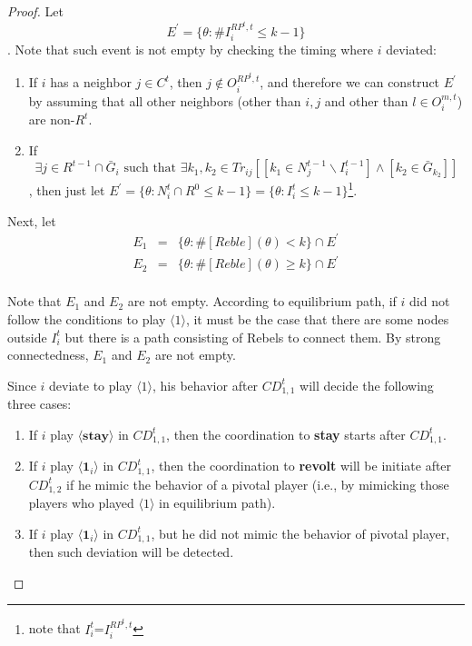 \documentclass[12pt,letter]{article}
\theoremstyle{definition}
\theoremstyle{remark}
\theoremstyle{claim}
\begin{document}
\begin{proof}


Let
\[E^{'}=\{\theta:\#I^{RP^t,t}_i\leq k-1\}\]
. Note that such event is not empty by checking the timing where $i$ deviated:
\begin{enumerate}
\item If $i$ has a neighbor $j\in C^t$, then $j\not\in O^{RP^t,t}_i$, and therefore we can construct $E^{'}$ by assuming that all other neighbors (other than $i,j$ and other than $l\in O^{m,t}_i$) are non-$R^t$.
\item If \[\exists j\in R^{t-1}\cap \bar{G}_i \text{ such that } \exists k_1,k_2\in Tr_{ij}[[k_1\in N^{t-1}_j\backslash I^{t-1}_i] \wedge [k_2\in \bar{G}_{k_2}]]\], then just let $E^{'}=\{\theta: N^t_i\cap R^0\leq k-1\}=\{\theta: I^t_i\leq k-1\}$\footnote{note that $I^t_i$=$I^{RP^t,t}_i$}.
\end{enumerate}

Next, let 
\begin{eqnarray*}
E_1&=&\{\theta: \#[Reble](\theta)<k\}\cap E^{'}\\
E_2&=&\{\theta: \#[Reble](\theta)\geq k\}\cap E^{'}\\
\end{eqnarray*}

Note that $E_1$ and $E_2$ are not empty. According to equilibrium path, if $i$ did not follow the conditions to play $\langle 1 \rangle$, it must be the case that there are some nodes outside $I^t_i$ but there is a path consisting of Rebels to connect them. By strong connectedness, $E_1$ and $E_2$ are not empty.

Since $i$ deviate to play $\langle 1 \rangle$, his behavior after $CD^t_{1,1}$ will decide the following three cases:
\begin{enumerate}
\item If $i$ play $\langle \textbf{stay} \rangle$ in $CD^t_{1,1}$, then the coordination to \textbf{stay} starts after $CD^t_{1,1}$.
\item If $i$ play $\langle \mathbf{1}_i \rangle$ in $CD^t_{1,1}$, then the coordination to \textbf{revolt} will be initiate after $CD^t_{1,2}$ if he mimic the behavior of a pivotal player (i.e., by mimicking those players who played $\langle 1 \rangle$ in equilibrium path).
\item If $i$ play $\langle \mathbf{1}_i \rangle$ in $CD^t_{1,1}$, but he did not mimic the behavior of pivotal player, then such deviation will be detected.
\end{enumerate}


\end{proof}
\end{document}
